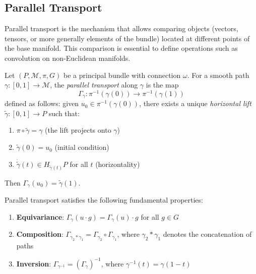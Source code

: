 \subsection{Parallel Transport}\label{subsec:transporte_paralelo_gdl}

Parallel transport is the mechanism that allows comparing objects (vectors, tensors, or more generally elements of the bundle) located at different points of the base manifold. This comparison is essential to define operations such as convolution on non-Euclidean manifolds.

\begin{definition}\label{def:transporte_paralelo_formal}
Let $(P, \mathcal{M}, \pi, G)$ be a principal bundle with connection $\omega$. For a smooth path $\gamma: [0,1] \to \mathcal{M}$, the \textit{parallel transport} along $\gamma$ is the map
\[
\Gamma_\gamma: \pi^{-1}(\gamma(0)) \to \pi^{-1}(\gamma(1))
\]
defined as follows: given $u_0 \in \pi^{-1}(\gamma(0))$, there exists a unique \textit{horizontal lift} $\tilde{\gamma}: [0,1] \to P$ such that:
\begin{enumerate}
    \item $\pi \circ \tilde{\gamma} = \gamma$ (the lift projects onto $\gamma$)
    \item $\tilde{\gamma}(0) = u_0$ (initial condition)
    \item $\dot{\tilde{\gamma}}(t) \in H_{\tilde{\gamma}(t)} P$ for all $t$ (horizontality)
\end{enumerate}
Then $\Gamma_\gamma(u_0) = \tilde{\gamma}(1)$.
\end{definition}

\begin{theorem}\label{thm:propiedades_transporte}
Parallel transport satisfies the following fundamental properties:
\begin{enumerate}
    \item \textbf{Equivariance}: $\Gamma_\gamma(u \cdot g) = \Gamma_\gamma(u) \cdot g$ for all $g \in G$
    \item \textbf{Composition}: $\Gamma_{\gamma_2 * \gamma_1} = \Gamma_{\gamma_2} \circ \Gamma_{\gamma_1}$, where $\gamma_2 * \gamma_1$ denotes the concatenation of paths
    \item \textbf{Inversion}: $\Gamma_{\gamma^{-1}} = (\Gamma_\gamma)^{-1}$, where $\gamma^{-1}(t) = \gamma(1-t)$
\end{enumerate}
\end{theorem}

